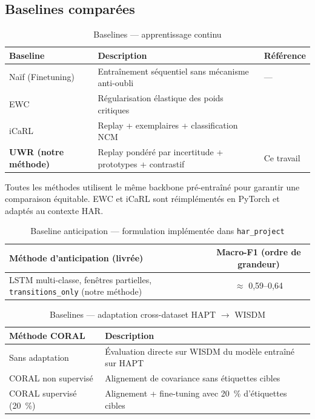 \documentclass[a4paper,12pt]{report}
\begin{document}
\subsection{Baselines comparées}

\begin{table}[H]
\centering
\small
\begin{tabularx}{\textwidth}{|Y|Y|Y|}
\hline
\textbf{Baseline} & \textbf{Description} & \textbf{Référence} \\
\hline
Naïf (Finetuning) & Entraînement séquentiel sans mécanisme anti-oubli & — \\
EWC & Régularisation élastique des poids critiques & \parencite{kirkpatrick2017} \\
iCaRL & Replay + exemplaires + classification NCM & \parencite{rebuffi2017} \\
\textbf{UWR (notre méthode)} & Replay pondéré par incertitude + prototypes + contrastif & Ce travail \\
\hline
\end{tabularx}
\caption{Baselines — apprentissage continu}
\label{tab:baselines_cl}
\end{table}

Toutes les méthodes utilisent le même backbone pré-entraîné pour garantir une comparaison équitable. EWC et iCaRL sont réimplémentés en PyTorch et adaptés au contexte HAR.

\begin{table}[H]
\centering
\small
\begin{tabularx}{0.88\textwidth}{|Y|c|}
\hline
\textbf{Méthode d'anticipation (livrée)} & \textbf{Macro-F1 (ordre de grandeur)} \\
\hline
LSTM multi-classe, fenêtres partielles,
\texttt{transitions\_only} (notre méthode) & $\approx$ 0,59--0,64 \\
\hline
\end{tabularx}
\caption{Baseline anticipation — formulation implémentée dans \texttt{har\_project}}
\label{tab:baselines_anticipation}
\end{table}

\begin{table}[H]
\centering
\small
\begin{tabularx}{\textwidth}{|Y|Y|}
\hline
\textbf{Méthode CORAL} & \textbf{Description} \\
\hline
Sans adaptation & Évaluation directe sur WISDM du modèle entraîné sur HAPT \\
CORAL non supervisé & Alignement de covariance sans étiquettes cibles \\
CORAL supervisé (20~\%) & Alignement + fine-tuning avec 20~\% d'étiquettes cibles \\
\hline
\end{tabularx}
\caption{Baselines — adaptation cross-dataset HAPT $\rightarrow$ WISDM}
\label{tab:baselines_coral}
\end{table}
\end{document}
